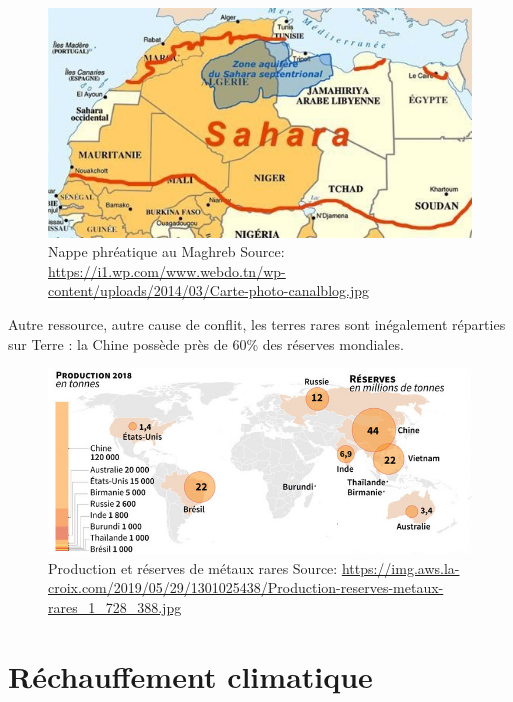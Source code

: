 \begin{figure}
  \centering
  \includegraphics[scale=0.40]{media/zone_aquifere_sahara.jpg}
  \caption{
    Nappe phréatique au Maghreb\newline
      \tiny{Source:\newline
        \url{https://i1.wp.com/www.webdo.tn/wp-content/uploads/2014/03/Carte-photo-canalblog.jpg}
      }
  }
  \label{fig:zone_aquifere_sahara}
\end{figure}

Autre ressource, autre cause de conflit, les terres rares sont inégalement réparties
sur Terre : la Chine possède près de 60\% des réserves mondiales.

\begin{figure}
  \centering
  \includegraphics[scale=0.5]{media/terres_rares.jpg}
  \caption{
    Production et réserves de métaux rares\newline
      \tiny{Source:\newline
        \url{https://img.aws.la-croix.com/2019/05/29/1301025438/Production-reserves-metaux-rares_1_728_388.jpg}
      }
  }
  \label{fig:terre_rare}
\end{figure}

\section{Réchauffement climatique}

